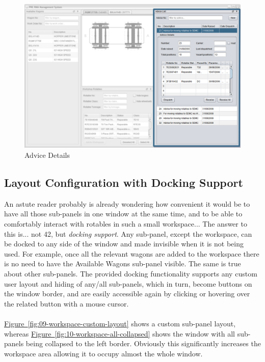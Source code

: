 \begin{figure}[!h]
\centering
\includegraphics[scale=0.37]{chapters/01-user-interface/images/07-advice-list-expanded.png}
\caption{Advice Details}\label{fig:07-advice-list-expanded}
\end{figure}

\clearpage

\subsection{Layout Configuration with Docking Support}
An astute reader probably is already wondering how convenient it would be to have all those sub-panels in one window at the same time, and to be able to comfortably interact with rotables in such a small workspace... The answer to this is... not 42, but \emph{docking support}. Any sub-panel, except the workspace, can be docked to any side of the window and made invisible when it is not being used. For example, once all the relevant wagons are added to the workspace there is no need to have the Available Wagons sub-panel visible. The same is true about other sub-panels. The provided docking functionality supports any custom user layout and hiding of any/all sub-panels, which in turn, become buttons on the window border, and are easily accessible again by clicking or hovering over the related button with a mouse cursor.
\\\\
\hyperref[fig:09-workspace-custom-layout]{Figure~\ref*{fig:09-workspace-custom-layout}} shows a custom sub-panel layout, whereas \hyperref[fig:10-workspace-all-collapsed]{Figure~\ref*{fig:10-workspace-all-collapsed}} shows the window with all sub-panels being collapsed to the left border. Obviously this significantly increases the workspace area allowing it to occupy almost the whole window.

